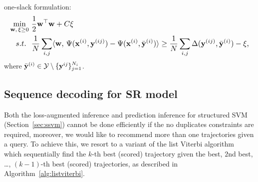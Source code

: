 one-slack formulation:
\begin{equation}
\label{eq:1slack_ml}
\resizebox{0.99\linewidth}{!}{$
\begin{aligned}
\min_{\w, \, \xi \ge 0} ~& \frac{1}{2} \w^\top \w + C \xi \\
s.t.~ ~& \frac{1}{N} \sum_{i,j} \langle \w, \, \Psi(\x^{(i)}, \y^{(ij)}) - \Psi(\x^{(i)}, \bar{\y}^{(i)}) \rangle \ge 
         \frac{1}{N} \sum_{i,j} \Delta(\y^{(ij)}, \bar{\y}^{(i)}) - \xi, 
\end{aligned}
$}
\end{equation}
where $\bar{\mathbf{y}}^{(i)} \in \mathcal{Y} \setminus \{\mathbf{y}^{ij}\}_{j=1}^{N_i}$.




\subsection{Sequence decoding for SR model}
\label{ssec:subtour}

Both the loss-augmented inference and prediction inference for structured SVM (Section~\ref{sec:ssvm}) cannot be done efficiently 
if the no duplicates constraints are required, moreover, we would like to recommend more than one trajectories given a query.
To achieve this, we resort to a variant of the list Viterbi algorithm~\cite{nilsson2001sequentially,seshadri1994list}
which sequentially find the $k$-th best (scored) trajectory given the best, $2$nd best, \dots, $(k-1)$-th best (scored) trajectories,
as described in Algorithm~\ref{alg:listviterbi}.


